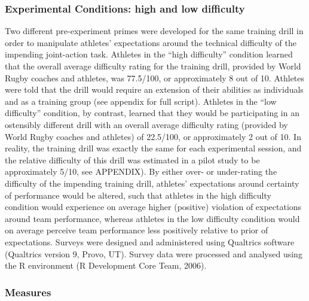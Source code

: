 \documentclass[english]{article}\usepackage[]{graphicx}\usepackage[]{color}
\begin{document}


\subsubsection{Experimental Conditions: high and low difficulty}
Two different pre-experiment primes were developed for the same training drill in order to manipulate athletes’ expectations around the technical difficulty of the impending joint-action task.  Athletes in the ``high difficulty'' condition learned that the overall average difficulty rating for the training drill, provided by World Rugby coaches and athletes, was 77.5/100, or approximately 8 out of 10.  Athletes were told that the drill would require an extension of their abilities as individuals and as a training group (see appendix for full script).  Athletes in the ``low difficulty'' condition, by contrast, learned that they would be participating in an ostensibly different drill with an overall average difficulty rating (provided by World Rugby coaches and athletes) of 22.5/100, or approximately 2 out of 10.  In reality, the training drill was exactly the same for each experimental session, and the relative difficulty of this drill was estimated in a pilot study to be approximately 5/10, see APPENDIX).  By either over- or under-rating the difficulty of the impending training drill, athletes' expectations around certainty of performance would be altered, such that athletes in the high difficulty condition would experience on average higher (positive) violation of expectations around team performance, whereas athletes in the low difficulty condition would on average perceive team performance less positively relative to prior of expectations. Surveys were designed and administered using Qualtrics software (Qualtrics version 9, Provo, UT). Survey data were processed and analysed using the R environment (R Development Core Team, 2006).


\subsubsection{Measures}
\end{document}
